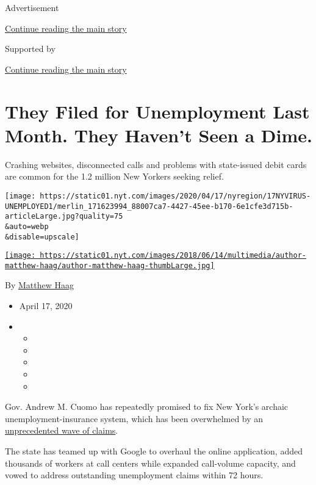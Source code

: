 Advertisement

\protect\hyperlink{after-top}{Continue reading the main story}

Supported by

\protect\hyperlink{after-sponsor}{Continue reading the main story}

\hypertarget{they-filed-for-unemployment-last-month-they-havent-seen-a-dime}{%
\section{They Filed for Unemployment Last Month. They Haven't Seen a
Dime.}\label{they-filed-for-unemployment-last-month-they-havent-seen-a-dime}}

Crashing websites, disconnected calls and problems with state-issued
debit cards are common for the 1.2 million New Yorkers seeking relief.

\texttt{[image: https://static01.nyt.com/images/2020/04/17/nyregion/17NYVIRUS-UNEMPLOYED1/merlin\_171623994\_88007ca7-4427-45ee-b170-6e1cfe3d715b-articleLarge.jpg?quality=75\\\&auto=webp\\\&disable=upscale]}

\href{https://www.nytimes.com/by/matthew-haag}{\texttt{[image: https://static01.nyt.com/images/2018/06/14/multimedia/author-matthew-haag/author-matthew-haag-thumbLarge.jpg]}}

By \href{https://www.nytimes.com/by/matthew-haag}{Matthew Haag}

\begin{itemize}
\item
  April 17, 2020
\item
  \begin{itemize}
  \item
  \item
  \item
  \item
  \item
  \end{itemize}
\end{itemize}

Gov. Andrew M. Cuomo has repeatedly promised to fix New York's archaic
unemployment-insurance system, which has been overwhelmed by an
\href{https://www.nytimes.com/2020/05/14/business/economy/coronavirus-unemployment-claims.html}{unprecedented
wave of claims}.

The state has teamed up with Google to overhaul the online application,
added thousands of workers at call centers while expanded call-volume
capacity, and vowed to address outstanding unemployment claims within 72
hours.

